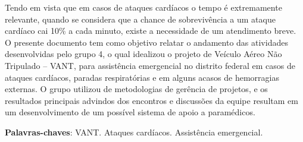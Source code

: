 \begin{resumo}
Tendo em vista que em casos de ataques cardíacos o tempo é extremamente relevante, quando se considera que a chance de sobrevivência a um ataque cardíaco cai 10\%\cite{SBC} a cada minuto, existe a necessidade de um atendimento breve. 
O presente documento tem como objetivo relatar o andamento das atividades desenvolvidas pelo grupo 4, o qual idealizou o projeto de Veículo Aéreo Não Tripulado – VANT,  para assistência emergencial no distrito federal em casos de ataques cardíacos, paradas respiratórias e em alguns acasos de hemorragias externas.
O grupo utilizou de metodologias de gerência de projetos, e os resultados principais advindos dos encontros e discussões da equipe resultam em um desenvolvimento de um possível sistema de apoio a paramédicos.

 \vspace{\onelineskip}
    
 \noindent
 \textbf{Palavras-chaves}: VANT. Ataques cardíacos. Assistência emergencial.
\end{resumo}
